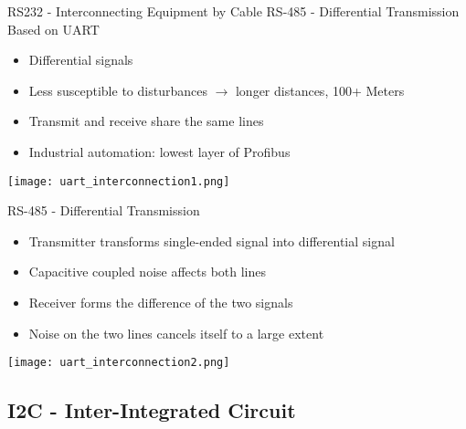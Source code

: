 \begin{concept}{RS232 - Interconnecting Equipment by Cable}
    RS-485 - Differential Transmission Based on UART
    \begin{itemize}
        \item Differential signals 
        \item Less susceptible to disturbances $\rightarrow$ longer distances, 100+ Meters
        \item Transmit and receive share the same lines
        \item Industrial automation: lowest layer of Profibus
    \end{itemize}
    \texttt{[image: uart\_interconnection1.png]}
\end{concept}

\begin{theorem}
    {RS-485 - Differential Transmission}
    \begin{itemize}
        \item Transmitter transforms single-ended signal into differential signal
        \item Capacitive coupled noise affects both lines
        \item Receiver forms the difference of the two signals
        \item Noise on the two lines cancels itself to a large extent
    \end{itemize}
    \texttt{[image: uart\_interconnection2.png]}
\end{theorem}


\raggedcolumns
\columnbreak






\subsection{I2C - Inter-Integrated Circuit}




